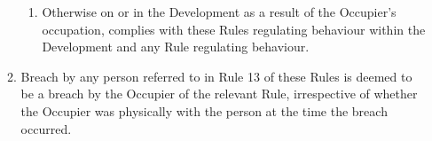 \documentclass{article}
\begin{document}
\begin{enumerate}[label=\arabic*.]
\begin{enumerate}[label=\arabic{enumi}.\arabic*.]
\begin{enumerate}[label=(\arabic*)]
\item  Otherwise on or in the Development as a result of the Occupier’s occupation, complies with these Rules regulating behaviour within the Development and any Rule regulating behaviour.

\end{enumerate}

\item  Breach by any person referred to in Rule 13 of these Rules is deemed to be a breach by the Occupier of the relevant Rule, irrespective of whether the Occupier was physically with the person at the time the breach occurred.

\end{enumerate}

\end{enumerate}
\end{document}
